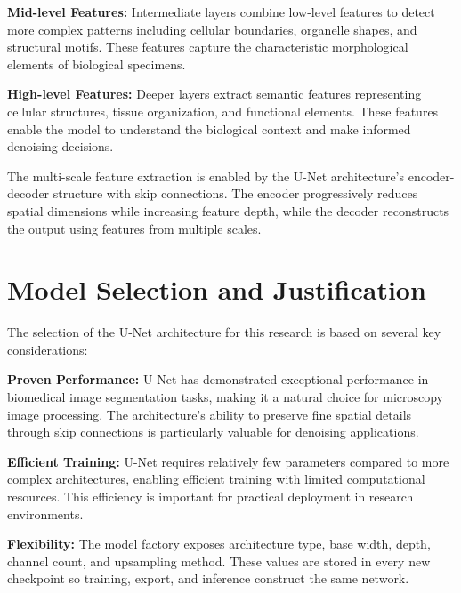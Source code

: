 \documentclass[12pt,a4paper]{report}
\begin{document}
\vspace{0.5cm}

\textbf{Mid-level Features:} Intermediate layers combine low-level features to detect more complex patterns including cellular boundaries, organelle shapes, and structural motifs. These features capture the characteristic morphological elements of biological specimens.

\vspace{0.5cm}

\textbf{High-level Features:} Deeper layers extract semantic features representing cellular structures, tissue organization, and functional elements. These features enable the model to understand the biological context and make informed denoising decisions.

\vspace{0.5cm}

The multi-scale feature extraction is enabled by the U-Net architecture's encoder-decoder structure with skip connections. The encoder progressively reduces spatial dimensions while increasing feature depth, while the decoder reconstructs the output using features from multiple scales.

\section{Model Selection and Justification}

The selection of the U-Net architecture for this research is based on several key considerations:

\vspace{0.5cm}

\textbf{Proven Performance:} U-Net has demonstrated exceptional performance in biomedical image segmentation tasks, making it a natural choice for microscopy image processing. The architecture's ability to preserve fine spatial details through skip connections is particularly valuable for denoising applications.

\vspace{0.5cm}

\textbf{Efficient Training:} U-Net requires relatively few parameters compared to more complex architectures, enabling efficient training with limited computational resources. This efficiency is important for practical deployment in research environments.

\vspace{0.5cm}

\textbf{Flexibility:} The model factory exposes architecture type, base width, depth, channel count, and upsampling method. These values are stored in every new checkpoint so training, export, and inference construct the same network.
\end{document}
